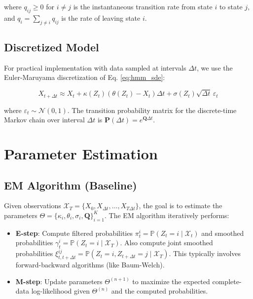 \documentclass{article}
\begin{document}
where $q_{ij} \ge 0$ for $i \neq j$ is the instantaneous transition rate from state $i$ to state $j$, and $q_i = \sum_{j \neq i} q_{ij}$ is the rate of leaving state $i$.

\subsection{Discretized Model}

For practical implementation with data sampled at intervals $\Delta t$, we use the Euler-Maruyama discretization of Eq. \ref{eq:hmm_sde}:

\begin{equation}
X_{t+\Delta t} \approx X_t + \kappa(Z_t)(\theta(Z_t) - X_t)\Delta t + \sigma(Z_t)\sqrt{\Delta t}\, \varepsilon_t
\label{eq:hmm_discrete}
\end{equation}

where $\varepsilon_t \sim \mathcal{N}(0, 1)$. The transition probability matrix for the discrete-time Markov chain over interval $\Delta t$ is $\mathbf{P}(\Delta t) = e^{\mathbf{Q} \Delta t}$.

\section{Parameter Estimation}

\subsection{EM Algorithm (Baseline)}

Given observations $\mathcal{X}_T = \{X_0, X_{\Delta t}, \dots, X_{T\Delta t}\}$, the goal is to estimate the parameters $\Theta = \{\kappa_i, \theta_i, \sigma_i, \mathbf{Q}\}_{i=1}^K$. The EM algorithm iteratively performs:

\begin{itemize}
    \item \textbf{E-step}: Compute filtered probabilities $\pi_t^i = \mathbb{P}(Z_t = i \mid \mathcal{X}_t)$ and smoothed probabilities $\gamma_t^i = \mathbb{P}(Z_t = i \mid \mathcal{X}_T)$. Also compute joint smoothed probabilities $\xi_{t,t+\Delta t}^{ij} = \mathbb{P}(Z_t = i, Z_{t+\Delta t} = j \mid \mathcal{X}_T)$. This typically involves forward-backward algorithms (like Baum-Welch).
    \item \textbf{M-step}: Update parameters $\Theta^{(n+1)}$ to maximize the expected complete-data log-likelihood given $\Theta^{(n)}$ and the computed probabilities.
\end{itemize}
\end{document}
